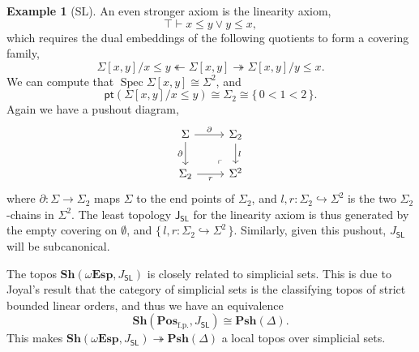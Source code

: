 \documentclass[a4paper,12pt]{amsart}
\theoremstyle{definition}
\newtheorem{example}[theorem]{Example}
\newcommand{\mb}[1]{\mathbf{#1}}
\newcommand{\mr}[1]{\mathrm{#1}}
\newcommand{\ms}[1]{\mathsf{#1}}
\newcommand{\Pos}{\mb{Pos}}
\newcommand{\sh}{\mb{Sh}}
\newcommand{\psh}{\mb{Psh}}
\newcommand{\set}[1]{\{\,#1\,\}}
\newcommand{\surj}{\twoheadrightarrow}
\newcommand{\hook}{\hookrightarrow}
\newcommand{\fp}{_{\mr{f.p.}}}
\newcommand{\emp}{\emptyset}
\newcommand{\pt}{\ms{pt}}
\newcommand{\wTop}{\omega\mb{Esp}}
\newcommand{\spec}{\operatorname{Spec}}
\begin{document}
\begin{example}[SL]
  An even stronger axiom is the linearity axiom, 
  \[ \top \vdash x \le y \vee y \le x, \]
  which requires the dual embeddings of the following quotients to form a covering family,
  \[ \Sigma[x,y]/x \le y \twoheadleftarrow \Sigma[x,y] \surj \Sigma[x,y]/y \le x. \]
  We can compute that $\spec \Sigma[x,y] \cong \Sigma^2$, and 
  \[ \pt(\Sigma[x,y]/x \le y) \cong \Sigma_2 \cong \set{0 < 1 < 2}. \]
  Again we have a pushout diagram,
  \[
  \begin{tikzcd}
    \Sigma \ar[r, "\partial"] \ar[d, "\partial"'] & \Sigma_2 \ar[d, "l"] \\ 
    \Sigma_2 \ar[r, "r"'] & \Sigma^2
    \arrow["\lrcorner"{anchor=center, pos=0.125, rotate=180}, draw=none, from=2-2, to=1-1]
  \end{tikzcd}
  \]
  where $\partial : \Sigma \to \Sigma_2$ maps $\Sigma$ to the end points of $\Sigma_2$, and $l,r : \Sigma_2 \hook \Sigma^2$ is the two $\Sigma_2$-chains in $\Sigma^2$. The least topology $\ms J_{\ms{SL}}$ for the linearity axiom is thus generated by the empty covering on $\emp$, and $\set{l,r : \Sigma_2 \hook \Sigma^2}$. Similarly, given this pushout, $J_{\ms{SL}}$ will be subcanonical.

  The topos $\sh(\wTop,J_{\ms{SL}})$ is closely related to simplicial sets. This is due to Joyal's result that the category of simplicial sets is the classifying topos of strict bounded linear orders, and thus we have an equivalence 
  \[ \sh(\Pos\fp,J_{\ms{SL}}) \cong \psh(\Delta). \]
  This makes $\sh(\wTop,J_{\ms{SL}}) \surj \psh(\Delta)$ a local topos over simplicial sets.
\end{example}
\end{document}
